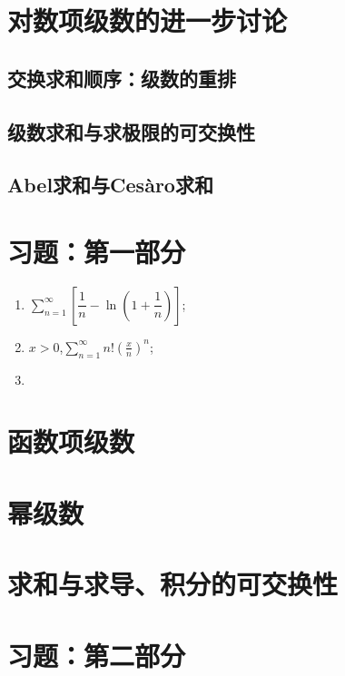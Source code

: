 \section{对数项级数的进一步讨论}
\subsection{交换求和顺序：级数的重排}
\subsection{级数求和与求极限的可交换性}
\subsection{Abel求和与Ces\`{a}ro求和}
\section{习题：第一部分}
\begin{exercise}[判断下列正项级数的敛散性]
    \begin{enumerate}
        \item \(\displaystyle\sum\limits_{n=1}^{\infty}\left[\dfrac{1}{n}-\ln(1+\dfrac{1}{n})\right]\);
        \item \(x>0\),\enspace  \(\displaystyle\sum\limits_{n=1}^{\infty}n!(\frac{x}{n})^n\);
        \item 
    \end{enumerate}
\end{exercise}
\section{函数项级数}
\section{幂级数}
\section{求和与求导、积分的可交换性}
\section{习题：第二部分}